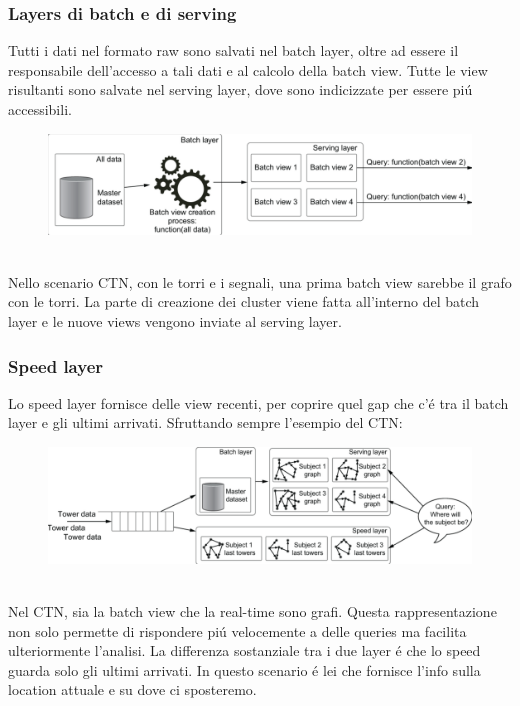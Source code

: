 \subsubsection*{Layers di batch e di serving}
Tutti i dati nel formato raw sono salvati nel batch layer, oltre ad essere il responsabile dell'accesso a tali dati e al calcolo della batch view. Tutte le view risultanti sono salvate nel serving layer, dove sono indicizzate per essere piú accessibili. 
\\
\begin{figure}[th]
    \centering
    \includegraphics[width=0.7\linewidth]{GraphDataEngineering//img/batchserving.png}
\end{figure}
\\
Nello scenario CTN, con le torri e i segnali, una prima batch view sarebbe il grafo con le torri. La parte di creazione dei cluster viene fatta all'interno del batch layer e le nuove views vengono inviate al serving layer. 

\subsubsection*{Speed layer}
Lo speed layer fornisce delle view recenti, per coprire quel gap che c'é tra il batch layer e gli ultimi arrivati. Sfruttando sempre l'esempio del CTN:
\\
\begin{figure}[th]
    \centering
    \includegraphics[width=0.8\linewidth]{GraphDataEngineering//img/speedlayer.png}
\end{figure}
\\
Nel CTN, sia la batch view che la real-time sono grafi. Questa rappresentazione non solo permette di rispondere piú velocemente a delle queries ma facilita ulteriormente l'analisi. La differenza sostanziale tra i due layer é che lo speed guarda solo gli ultimi arrivati. In questo scenario é lei che fornisce l'info sulla location attuale e su dove ci sposteremo. 

